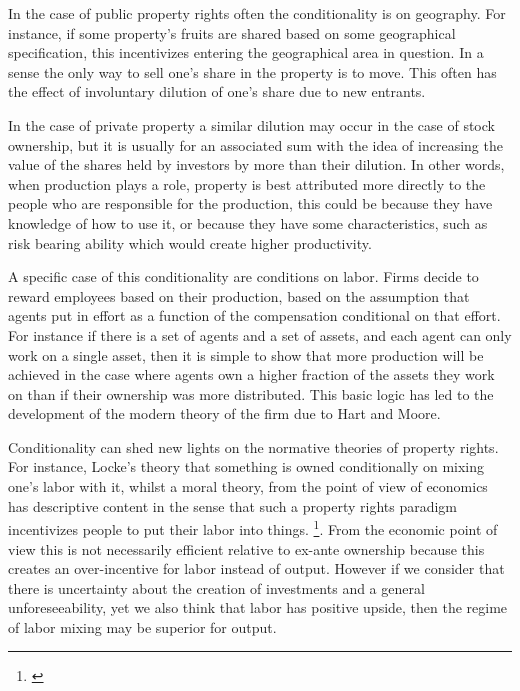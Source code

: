 \documentclass[12pt]{article}
\numberwithin{equation}{section}
\begin{document}
In the case of public property rights often the conditionality is on geography. For instance, if some property's fruits are shared based on some geographical specification, this incentivizes entering the geographical area in question. In a sense the only way to sell one's share in the property is to move. This often has the effect of involuntary dilution of one's share due to new entrants.

In the case of private property a similar dilution may occur in the case of stock ownership, but it is usually for an associated sum with the idea of increasing the value of the shares held by investors by more than their dilution. In other words, when production plays a role, property is best attributed more directly to the people who are responsible for the production, this could be because they have knowledge of how to use it, or because they have some characteristics, such as risk bearing ability which would create higher productivity.  

A specific case of this conditionality are conditions on labor. Firms decide to reward employees based on their production, based on the assumption that agents put in effort as a function of the compensation conditional on that effort. For instance if there is a set of agents and a set of assets, and each agent can only work on a single asset, then it is simple to show that more production will be achieved in the case where agents own a higher fraction of the assets they work on than if their ownership was more distributed. This basic logic has led to the development of the modern theory of the firm due to Hart and Moore. 

Conditionality can shed new lights on the normative theories of property rights. For instance, Locke's theory that something is owned conditionally on mixing one's labor with it, whilst a moral theory, from the point of view of economics has descriptive content in the sense that such a property rights paradigm incentivizes people to put their labor into things. \footnote{\cite{nozick1974anarchy}}. From the economic point of view this is not necessarily efficient relative to ex-ante ownership because this creates an over-incentive for labor instead of output. However if we consider that there is uncertainty about the creation of investments and a general unforeseeability, yet we also think that labor has positive upside, then the regime of labor mixing may be superior for output. 
\end{document}
